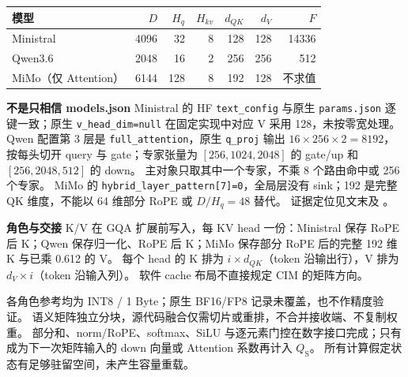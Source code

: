 \documentclass[11pt,a4paper,fontset=fandol]{ctexart}
\newcommand{\qs}{Q_{\mathrm S}}
\newcommand{\para}[1]{\par\smallskip\noindent\textbf{#1}\quad}
\begin{document}
\begin{center}\small
\begin{tabular}{@{}lrrrrrr@{}}\toprule
模型 & $D$ & $H_q$ & $H_{kv}$ & $d_{QK}$ & $d_V$ & $F$\\\midrule
Ministral & 4096 & 32 & 8 & 128 & 128 & 14336\\
Qwen3.6 & 2048 & 16 & 2 & 256 & 256 & 512\\
MiMo（仅 Attention） & 6144 & 128 & 8 & 192 & 128 & 不求值\\\bottomrule
\end{tabular}\end{center}

\para{不是只相信 models.json}
Ministral 的 HF \texttt{text\_config} 与原生 \texttt{params.json} 逐键一致；原生
\texttt{v\_head\_dim=null} 在固定实现中对应 V 采用 128，未按零宽处理。
Qwen 配置第 3 层是 \texttt{full\_attention}，原生 \texttt{q\_proj} 输出
$16\times256\times2=8192$，按每头切开 query 与 gate；专家张量为
$[256,1024,2048]$ 的 gate/up 和 $[256,2048,512]$ 的 down。
主对象只取其中一个专家，不乘 8 个路由命中或 256 个专家。
MiMo 的 \texttt{hybrid\_layer\_pattern[7]=0}，全局层没有 sink；192 是完整 QK 维度，不能以 64 维部分 RoPE 或 $D/H_q=48$ 替代。
证据定位见文末及 。

\para{角色与交接}
K/V 在 GQA 扩展前写入，每 KV head 一份：Ministral 保存 RoPE 后 K；Qwen 保存归一化、RoPE 后 K；MiMo 保存部分 RoPE 后的完整 192 维 K 与已乘 0.612 的 V。
每个 head 的 K 排为 $i\times d_{QK}$（token 沿输出行），V 排为 $d_V\times i$（token 沿输入列）。
软件 cache 布局不直接规定 CIM 的矩阵方向。

各角色参考均为 INT8 / 1 Byte；原生 BF16/FP8 记录未覆盖，也不作精度验证。
语义矩阵独立分块，源代码融合仅需切片或重排，不合并接收端、不复制权重。
部分和、norm/RoPE、softmax、SiLU 与逐元素门控在数字接口完成；只有成为下一次矩阵输入的 down 向量或 Attention 系数再计入 $\qs$。
所有计算假定状态有足够驻留空间，未产生容量重载。

\clearpage
\end{document}
